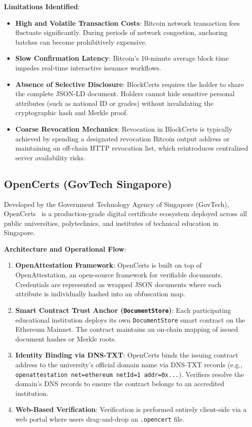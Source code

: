 \textbf{Limitations Identified}:
\begin{itemize}
    \item \textbf{High and Volatile Transaction Costs}: Bitcoin network transaction fees fluctuate significantly. During periods of network congestion, anchoring batches can become prohibitively expensive.
    \item \textbf{Slow Confirmation Latency}: Bitcoin's 10-minute average block time impedes real-time interactive issuance workflows.
    \item \textbf{Absence of Selective Disclosure}: BlockCerts requires the holder to share the complete JSON-LD document. Holders cannot hide sensitive personal attributes (such as national ID or grades) without invalidating the cryptographic hash and Merkle proof.
    \item \textbf{Coarse Revocation Mechanics}: Revocation in BlockCerts is typically achieved by spending a designated revocation Bitcoin output address or maintaining an off-chain HTTP revocation list, which reintroduces centralized server availability risks.
\end{itemize}

\subsection{OpenCerts (GovTech Singapore)}

Developed by the Government Technology Agency of Singapore (GovTech), OpenCerts~\cite{OpenCerts2019Whitepaper,GovTechSingapore2021OpenCerts} is a production-grade digital certificate ecosystem deployed across all public universities, polytechnics, and institutes of technical education in Singapore.

\textbf{Architecture and Operational Flow}:
\begin{enumerate}
    \item \textbf{OpenAttestation Framework}: OpenCerts is built on top of OpenAttestation, an open-source framework for verifiable documents. Credentials are represented as wrapped JSON documents where each attribute is individually hashed into an obfuscation map.
    \item \textbf{Smart Contract Trust Anchor (\texttt{DocumentStore})}: Each participating educational institution deploys its own \texttt{DocumentStore} smart contract on the Ethereum Mainnet. The contract maintains an on-chain mapping of issued document hashes or Merkle roots.
    \item \textbf{Identity Binding via DNS-TXT}: OpenCerts binds the issuing contract address to the university's official domain name via DNS-TXT records (e.g., \texttt{openattestation net=ethereum netId=1 addr=0x...}). Verifiers resolve the domain's DNS records to ensure the contract belongs to an accredited institution.
    \item \textbf{Web-Based Verification}: Verification is performed entirely client-side via a web portal where users drag-and-drop an \texttt{.opencert} file.
\end{enumerate}

